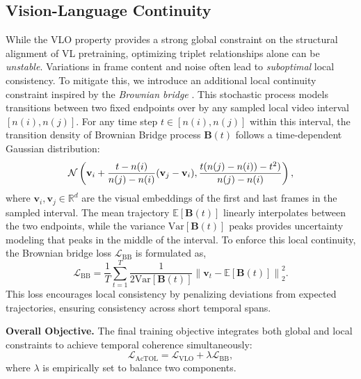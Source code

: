 \subsection{Vision-Language Continuity}
\label{sec:bb}
While the VLO property provides a strong global constraint on the structural alignment of VL pretraining, optimizing triplet relationships alone can be \textit{unstable}. Variations in frame content and noise often lead to \textit{suboptimal} local consistency. To mitigate this, we introduce an additional local continuity constraint inspired by the \textit{Brownian bridge} \cite{revuz2013continuous}. This stochastic process models transitions between two fixed endpoints over by any sampled local video interval $[n(i), n(j)]$. For any time step $t\in[n(i), n(j)]$ within this interval, the transition density of Brownian Bridge process $\mathbf{B}(t)$ follows a time-dependent Gaussian distribution:
\begin{equation}\small\nonumber
\mathcal{N}\left(\mathbf{v}_i + \frac{t - n(i)}{n(j) - n(i)}(\mathbf{v}_j - \mathbf{v}_i), \frac{t(n(j)-n(i))-t^2)}{n(j) - n(i)}\right),
\end{equation}
where \(\mathbf{v}_i,\mathbf{v}_j\in\mathbb{R}^d\) are the visual embeddings of the first and last frames in the sampled interval. The mean trajectory $\mathbb{E}[\mathbf{B}(t)]$ linearly interpolates between the two endpoints, while the variance  $\mathrm{Var}[\mathbf{B}(t)]$ peaks provides uncertainty modeling that peaks in the middle of the interval. To enforce this local continuity, the Brownian bridge loss $\mathcal{L}_{\operatorname{BB}}$ is formulated as,
\begin{equation}
\mathcal{L}_{\mathrm{BB}} = \frac{1}{T} \sum_{t=1}^{T} \frac{1}{2 \mathrm{Var}[\mathbf{B}(t)]}\left\|\mathbf{v}_t - \mathbb{E}[\mathbf{B}(t)] \right\|_2^2.
\end{equation}
This loss encourages local consistency by penalizing deviations from expected trajectories, ensuring consistency across short temporal spans.


\noindent\textbf{Overall Objective.} The final training objective integrates both global and local constraints to achieve temporal coherence simultaneously:
\begin{equation}
\mathcal{L}_{\mathrm{AcTOL}} = \mathcal{L}_{\mathrm{VLO}} + \lambda \mathcal{L}_{\mathrm{BB}},
\end{equation}
where $\lambda$ is empirically set to balance two components.

